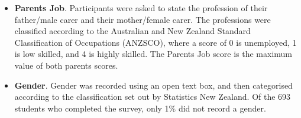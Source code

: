 \begin{itemize}
    \item \textbf{Parents Job}. Participants were asked to state the profession of their father/male carer and their mother/female carer. The professions were classified according to the Australian and New Zealand Standard Classification of Occupations (ANZSCO), where a score of 0 is unemployed, 1 is low skilled, and 4 is highly skilled. The Parents Job score is the maximum value of both parents scores.
    \item \textbf{Gender}. Gender was recorded using an open text box, and then categorised according to the classification set out by Statistics New Zealand. Of the 693 students who completed the survey, only 1\% did not record a gender. 

\end{itemize}

\begin{landscape}
\begin{table}[ht]
\label{tab:ItemMeansSDs}       %


\end{table}
\end{landscape}
